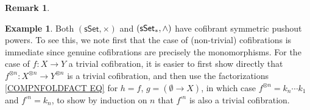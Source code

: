 \documentclass[a4paper,10pt
,draft
]{article}%
\numberwithin{equation}{section}
\numberwithin{figure}{section}
\theoremstyle{definition} %
\newtheorem{example}[equation]{Example}%
\newtheorem{remark}[equation]{Remark}%
\newcommand{\sSet}{\ensuremath{\mathsf{sSet}}}%
\newcommand{\V}{\ensuremath{\mathcal V}}
\newcommand{\1}{\ensuremath{\mathbbm 1}}%
\begin{document}
\begin{remark}

\end{remark}





\begin{example}
      \label{SSET_CSPP_EX}
	Both $(\mathsf{sSet},\times)$ and 
	$(\mathsf{sSet}_{\**},\wedge)$ have cofibrant symmetric pushout powers.
        To see this, we note first that the case of (non-trivial) cofibrations is immediate since
        genuine cofibrations 
        are precisely the monomorphisms. 
	For the case of $f \colon X \to Y$ a trivial cofibration, it is easier to first show directly that 
	$f^{\otimes n} \colon X^{\otimes n} \to Y^{\otimes n}$
	is a trivial cofibration, 
	and then use the factorizations
	\eqref{COMPNFOLDFACT EQ}
	for $h=f$, $g=(\emptyset \to X)$, 
	in which case $f^{\otimes n} = k_n\cdots k_1$ and 
	$f^{\square n} = k_n$,
	to show by induction on $n$ that 
	$f^{\square n}$ is also a trivial cofibration.
\end{example}
\end{document}
